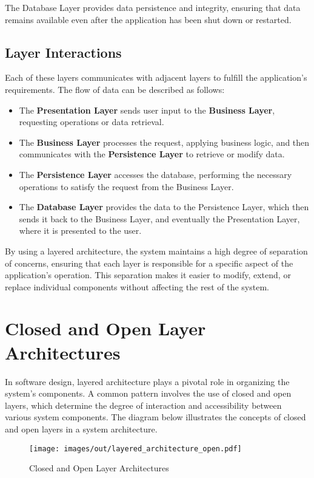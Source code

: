 The Database Layer provides data persistence and integrity, ensuring that data remains available even after the application has been shut down or restarted.

\subsection{Layer Interactions}

Each of these layers communicates with adjacent layers to fulfill the application’s requirements. The flow of data can be described as follows:

\begin{itemize}
	\item The \textbf{Presentation Layer} sends user input to the \textbf{Business Layer}, requesting operations or data retrieval.
	\item The \textbf{Business Layer} processes the request, applying business logic, and then communicates with the \textbf{Persistence Layer} to retrieve or modify data.
	\item The \textbf{Persistence Layer} accesses the database, performing the necessary operations to satisfy the request from the Business Layer.
	\item The \textbf{Database Layer} provides the data to the Persistence Layer, which then sends it back to the Business Layer, and eventually the Presentation Layer, where it is presented to the user.
\end{itemize}

By using a layered architecture, the system maintains a high degree of separation of concerns, ensuring that each layer is responsible for a specific aspect of the application’s operation. This separation makes it easier to modify, extend, or replace individual components without affecting the rest of the system.

\section{Closed and Open Layer Architectures}

In software design, layered architecture plays a pivotal role in organizing the system's components. A common pattern involves the use of closed and open layers, which determine the degree of interaction and accessibility between various system components. The diagram below illustrates the concepts of closed and open layers in a system architecture.

\begin{figure}[ht]
	\centering
	\texttt{[image: images/out/layered\_architecture\_open.pdf]}
	\caption{Closed and Open Layer Architectures}
	\label{fig:layered_architecture_open}
\end{figure}

